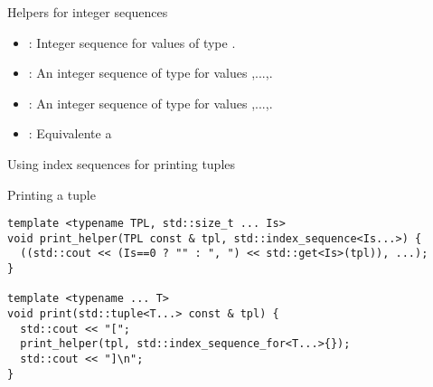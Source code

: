 \begin{frame}[t,fragile]{Helpers for integer sequences}
\begin{itemize}
  \item {}: 
        Integer sequence for values of type .

  \item {}:
        An integer sequence of type  for values ,...,.

  \item {}:
        An integer sequence of type  for values ,...,.

  \item {}:
        Equivalente a 
  
\end{itemize}
\end{frame}

\begin{frame}[t,fragile]{Using index sequences for printing tuples}
\begin{block}{Printing a tuple}
\begin{lstlisting}
template <typename TPL, std::size_t ... Is>
void print_helper(TPL const & tpl, std::index_sequence<Is...>) {
  ((std::cout << (Is==0 ? "" : ", ") << std::get<Is>(tpl)), ...);
}

template <typename ... T>
void print(std::tuple<T...> const & tpl) {
  std::cout << "[";
  print_helper(tpl, std::index_sequence_for<T...>{});
  std::cout << "]\n";
}
\end{lstlisting}
\end{block}
\end{frame}
